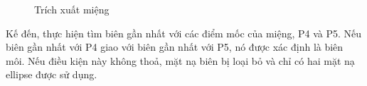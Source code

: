 \documentclass[journal]{IEEEtran}
\begin{document}
\begin{figure}[!h]
\caption{Trích xuất miệng}
\label{refhinh7}
\end{figure}
Kế đến, thực hiện tìm biên gần nhất với các điểm mốc của miệng, P4 và P5. Nếu biên gần nhất với P4 giao với biên gần nhất với P5, nó được xác định là biên môi. Nếu điều kiện này không thoả, mặt nạ biên bị loại bỏ và chỉ có hai mặt nạ ellipse được sử dụng.
\end{document}
